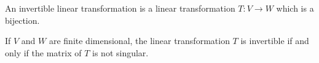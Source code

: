 \documentclass{article}
\begin{document}
An invertible linear transformation is a linear transformation $T: V \longrightarrow W$ which is a bijection.

If $V$ and $W$ are finite dimensional, the linear transformation $T$ is invertible if and only if the matrix of $T$ is not singular.
\end{document}
